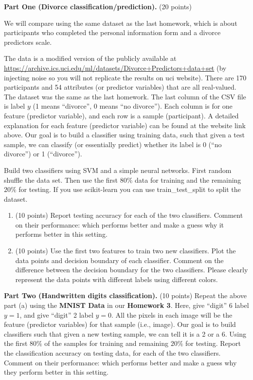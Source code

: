 \documentclass[twoside,10pt]{article}
\begin{document}
\begin{enumerate}
\textbf{Part One (Divorce classification/prediction).} (20 points) 

We will compare using the same dataset as the last homework, which is about participants who completed the personal information form and a divorce predictors scale. 

The data is a modified version of the publicly available at \url{https://archive.ics.uci.edu/ml/datasets/Divorce+Predictors+data+set} (by injecting noise so you will not replicate the results on uci website). There are 170 participants and 54 attributes (or predictor variables) that are all real-valued. The dataset was the same as the last homework. The last column of the CSV file is label $y$ (1 means ``divorce'', 0 means ``no divorce''). Each column is for one feature (predictor variable), and each row is a sample (participant). A detailed explanation for each feature (predictor variable) can be found at the website link above. Our goal is to build a classifier using training data, such that given a test sample, we can classify (or essentially predict) whether its label is 0 (``no divorce'') or 1 (``divorce''). 

Build two classifiers using SVM and a simple neural networks. First random shuffle the data set. Then use the first $80\%$ data for training and the remaining $20\%$ for testing. If you use \textsf{scikit-learn} you can use \textsf{train\_test\_split} to split the dataset. 

\begin{enumerate}

	\item (10 points) Report testing accuracy for each of the two classifiers.  Comment on their performance: which performs better and make a guess why it performs better in this setting. 
	\item (10 points) Use the first two features to train two new classifiers. Plot the data points and decision boundary of each classifier. Comment on the difference between the decision boundary for the two classifiers. Please clearly represent the data points with different labels using different colors.
\end{enumerate}

\textbf{Part Two (Handwritten digits classification).} (10 points) Repeat the above part (a) using the \textbf{MNIST Data} in our \textbf{Homework 3}. Here, give ``digit'' 6 label $y = 1$, and give ``digit'' 2 label $y = 0$. All the pixels in each image will be the feature (predictor variables) for that sample (i.e., image). Our goal is to build classifiers such that given a new testing sample, we can tell it is a 2 or a 6. Using the first $80\%$ of the samples for training and remaining $20\%$ for testing. Report the classification accuracy on testing data, for each of the two classifiers. Comment on their performance: which performs better and make a guess why they perform better in this setting. 

\end{enumerate}
\end{document}
